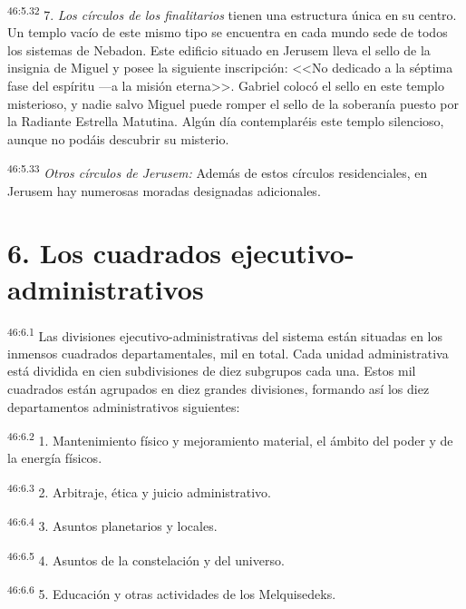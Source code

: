\par
\textsuperscript{46:5.32} 7. \textit{Los círculos de los finalitarios} tienen una estructura única en su centro. Un templo vacío de este mismo tipo se encuentra en cada mundo sede de todos los sistemas de Nebadon. Este edificio situado en Jerusem lleva el sello de la insignia de Miguel y posee la siguiente inscripción: <<No dedicado a la séptima fase del espíritu ---a la misión eterna>>. Gabriel colocó el sello en este templo misterioso, y nadie salvo Miguel puede romper el sello de la soberanía puesto por la Radiante Estrella Matutina. Algún día contemplaréis este templo silencioso, aunque no podáis descubrir su misterio.

\par
\textsuperscript{46:5.33} \textit{Otros círculos de Jerusem:} Además de estos círculos residenciales, en Jerusem hay numerosas moradas designadas adicionales.

\section*{6. Los cuadrados ejecutivo-administrativos}
\par
\textsuperscript{46:6.1} Las divisiones ejecutivo-administrativas del sistema están situadas en los inmensos cuadrados departamentales, mil en total. Cada unidad administrativa está dividida en cien subdivisiones de diez subgrupos cada una. Estos mil cuadrados están agrupados en diez grandes divisiones, formando así los diez departamentos administrativos siguientes:

\par
\textsuperscript{46:6.2} 1. Mantenimiento físico y mejoramiento material, el ámbito del poder y de la energía físicos.

\par
\textsuperscript{46:6.3} 2. Arbitraje, ética y juicio administrativo.

\par
\textsuperscript{46:6.4} 3. Asuntos planetarios y locales.

\par
\textsuperscript{46:6.5} 4. Asuntos de la constelación y del universo.

\par
\textsuperscript{46:6.6} 5. Educación y otras actividades de los Melquisedeks.


